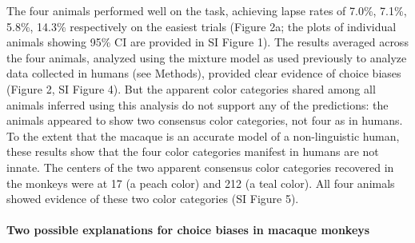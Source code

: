 \documentclass[9pt,biorxiv,lineno,onehalfspacing]{lapreprint}
\begin{document}
\begin{refsection}
The four animals performed well on the task, achieving lapse rates of 7.0\%, 7.1\%, 5.8\%, 14.3\% respectively on the easiest trials (Figure 2a; the plots of individual animals showing 95\% CI are provided in SI Figure 1). 
The results averaged across the four animals, analyzed using the mixture model as used previously to analyze data collected in humans \citep{bae_why_2015,zhang_discrete_2008} (see Methods), provided clear evidence of choice biases (Figure 2, SI Figure 4). 
But the apparent color categories shared among all animals inferred using this analysis do not support any of the predictions: the animals appeared to show two consensus color categories, not four as in humans. 
To the extent that the macaque is an accurate model of a non-linguistic human, these results show that the four color categories manifest in humans are not innate. 
The centers of the two apparent consensus color categories recovered in the monkeys were at 17\degree{} (a peach color) and 212\degree{} (a teal color). 
All four animals showed evidence of these two color categories (SI Figure 5).

\paragraph{Two possible explanations for choice biases in macaque monkeys}


\end{refsection}
\end{document}
